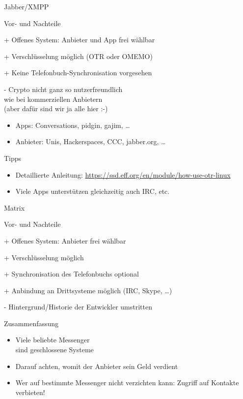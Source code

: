 \begin{frame}{Jabber/XMPP}
  \begin{blex}{Vor- und Nachteile}
    \item[+] Offenes System: Anbieter und App frei wählbar
    \item[+] Verschlüsselung möglich (OTR oder OMEMO)
    \item[+] Keine Telefonbuch-Synchronisation vorgesehen
    \item[-] Crypto nicht ganz so nutzerfreundlich\\wie bei kommerziellen Anbietern\\(aber dafür sind wir ja alle hier :-)
  \end{blex}
  \begin{itemize}
    \item Apps: Conversations, pidgin, gajim, \ldots
    \item Anbieter: Unis, Hackerspaces, CCC, jabber.org, \ldots
  \end{itemize}
  \begin{block}{Tipps}
    \begin{itemize}
      \item Detaillierte Anleitung: {\small\url{https://ssd.eff.org/en/module/how-use-otr-linux}}
      \item Viele Apps unterstützen gleichzeitig auch IRC, etc.
    \end{itemize}
  \end{block}
\end{frame}

\begin{frame}{Matrix}
  \begin{blex}{Vor- und Nachteile}
    \item[+] Offenes System: Anbieter frei wählbar
    \item[+] Verschlüsselung möglich
    \item[+] Synchronisation des Telefonbuchs optional
    \item[+] Anbindung an Drittsysteme möglich (IRC, Skype, \ldots)
    \item[-] Hintergrund/Historie der Entwickler umstritten
  \end{blex}
\end{frame}

\begin{frame}{Zusammenfassung}
  \begin{itemize}
    \item Viele beliebte Messenger\\ sind geschlossene Systeme
    \item Darauf achten, womit der Anbieter sein Geld verdient
    \item Wer auf bestimmte Messenger nicht verzichten kann: Zugriff auf Kontakte verbieten!
  \end{itemize}
\end{frame}
